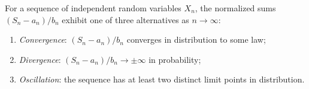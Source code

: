 For a sequence of independent random variables $X_n$, the normalized sums $(S_n - a_n)/b_n$ exhibit one of three alternatives as $n \to \infty$:
\begin{enumerate}
\item \textit{Convergence}: $(S_n - a_n)/b_n$ converges in distribution to some law;
\item \textit{Divergence}: $(S_n - a_n)/b_n \to \pm\infty$ in probability;
\item \textit{Oscillation}: the sequence has at least two distinct limit points in distribution.
\end{enumerate}
